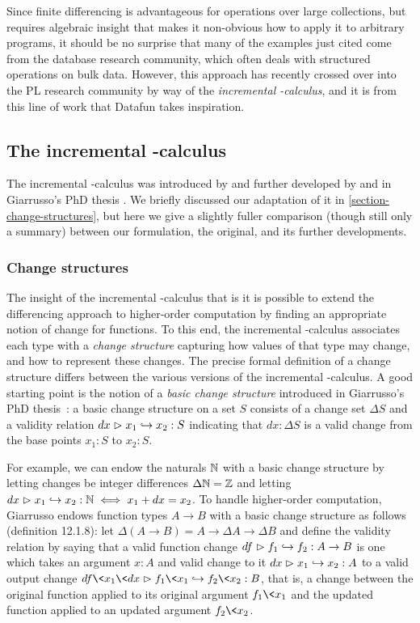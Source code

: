 Since finite differencing is advantageous for operations over large collections,
but requires algebraic insight that makes it non-obvious how to apply it to
arbitrary programs, it should be no surprise that many of the examples just
cited come from the database research community, which often deals with
structured operations on bulk data.
%
However, this approach has recently crossed over into the PL research community
by way of the \emph{incremental \fn-calculus}, and it is from this line of work
that Datafun takes inspiration.


\subsection{The incremental \boldfn-calculus}
\label{section-incremental-lambda-calculus}

The incremental \fn-calculus was introduced by \citet*{incremental} and further
developed by \citet*{DBLP:conf/esop/GiarrussoRS19} and in Giarrusso's PhD thesis
\citeyearpar{DBLP:phd/dnb/Giarrusso20}.
%
We briefly discussed our adaptation of it in \cref{section-change-structures},
but here we give a slightly fuller comparison (though still only a summary)
between our formulation, the original, and its further developments.


\subsubsection{Change structures}

The insight of the incremental \fn-calculus that is it is possible to extend the differencing approach to higher-order computation by finding an appropriate notion of change for functions.
%
To this end, the incremental \fn-calculus associates each type with a \emph{change structure} capturing how values of that type may change, and how to represent these changes.
%
The precise formal definition of a change structure differs between the various versions of the incremental \fn-calculus.
%
A good starting point is the notion of a \emph{basic change structure} introduced in Giarrusso's PhD thesis~\citeyearpar[chapter 12, definition 12.1.1]{DBLP:phd/dnb/Giarrusso20}:
%
a basic change structure on a set $S$ consists of a change set $\Delta S$ and a validity relation $\gvalid{S}{dx}{x_1}{x_2}$ indicating that $dx : \Delta S$ is a valid change from the base points $x_1 : S$ to $x_2 : S$.

For example, we can endow the naturals $\N$ with a basic change structure by
letting changes be integer differences $\Delta \N = \mathbb{Z}$ and letting
$\gvalid{\N}{dx}{x_1}{x_2} \iff x_1 + dx = x_2$.
%
To handle higher-order computation, Giarrusso endows function types $A \to B$
with a basic change structure as follows (definition 12.1.8): let $\Delta(A \to
B) = A \to \Delta A \to \Delta B$ and define the validity relation by saying
that a valid function change $\gvalid{A \to B}{df}{f_1}{f_2}$ is one which takes
an argument $x : A$ and valid change to it $\gvalid{A}{dx}{x_1}{x_2}$ to a valid
output change $\gvalid{B}{df\<x_1\<dx}{f_1\<x_1}{f_2\<x_2}$, that is, a change
between the original function applied to its original argument $f_1\<x_1$ and
the updated function applied to an updated argument $f_2\<x_2$.

